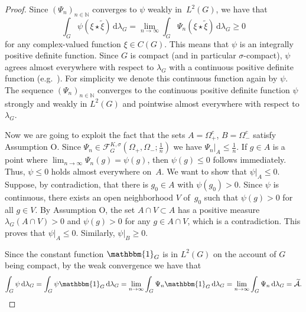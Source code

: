 \documentclass[[a4paper,english,12pt]{amsart}
\theoremstyle{plain}
\theoremstyle{remark}
\newcommand{\NN}{\mathbb N}
\begin{document}
\begin{proof}
Since $(\Psi_n)_{n \in \NN}$ converges to $\psi$ weakly in~$L^2(G)$, we have that
$$
\int_G \psi (\xi \star \widetilde{\xi}) \,\mbox{d}\lambda_G =  \lim_{n \to \infty} \int_G \Psi_n (\xi \star \widetilde{\xi}) \,\mbox{d}\lambda_G \ge 0
$$
for any complex-valued function $\xi \in C(G)$. This means that $\psi$ is an integrally positive definite function. Since $G$ is compact (and in particular $\sigma$-compact), $\psi$ agrees almost everywhere with respect to $\lambda_G$ with a continuous positive definite function (e.g.~\cite[Theorem 1.7.3]{sasvari}). For simplicity we denote this continuous function again by $\psi$.  The sequence $(\Psi_n)_{n \in \NN}$ converges to the continuous positive definite function $\psi$ strongly and weakly in $L^2(G)$ and pointwise almost everywhere with respect to $\lambda_G$.

Now we are going to exploit the fact that the sets $A = \Omega_+^c$, $B = \Omega_-^c$ satisfy Assumption O. Since $\Psi_n \in \mathcal{F}^{K,\sigma}_G \left( \Omega_+, \Omega_-; \frac{1}{n} \right)$ we have $\Psi_n|_{A} \le \frac{1}{n}$.  If $g \in A$ is a point where $\lim_{n \to \infty} \Psi_n(g) = \psi(g)$, then $\psi(g) \le 0$ follows immediately. Thus, $\psi \le 0$ holds almost everywhere on~$A$. We want to show that $\psi|_{A} \le 0$. Suppose, by contradiction, that there is $g_0 \in A$ with $\psi(g_0) > 0$. Since $\psi$ is continuous, there exists an open neighborhood $V$ of~$g_0$ such that $\psi(g) > 0$ for all $g \in V$. By Assumption O, the set $A \cap V \subset A$ has a positive measure $\lambda_G(A \cap V) > 0$ and $\psi(g) > 0$ for any $g \in A \cap V$, which is a contradiction. This proves that $\psi|_{A} \le 0$. Similarly, $\psi|_{B} \ge 0$.

Since the constant function $\mathbbm{1}_G$ is in $L^2(G)$ on the account of $G$ being compact, by the weak convergence we have that 
$$
\int_G \psi \,\mbox{d}\lambda_G = \int_G \psi \mathbbm{1}_G \,\mbox{d}\lambda_G 
= \lim_{n \to \infty} \int_G \Psi_n \mathbbm{1}_G \,\mbox{d}\lambda_G 
=  \lim_{n \to \infty} \int_G \Psi_n \,\mbox{d}\lambda_G = \widetilde{\mathcal{A}}.
$$


\end{proof}
\end{document}
